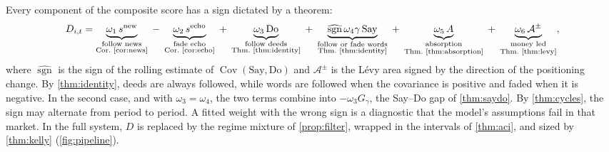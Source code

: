 \documentclass[11pt,a4paper]{article}
\theoremstyle{plain}
\theoremstyle{definition}
\theoremstyle{remark}
\DeclareMathOperator{\sgn}{sgn}
\DeclareMathOperator{\Cov}{Cov}
\begin{document}
Every component of the composite score has a sign dictated by a theorem:
\[
  D_{i,t}=
  \underbrace{\omega_1\,s^{\text{new}}}_{\substack{\text{follow news}\\ \text{Cor.~\ref{cor:news}}}}
  \;-\;\underbrace{\omega_2\,s^{\text{echo}}}_{\substack{\text{fade echo}\\ \text{Cor.~\ref{cor:echo}}}}
  \;+\;\underbrace{\omega_3\,\text{Do}}_{\substack{\text{follow deeds}\\ \text{Thm.~\ref{thm:identity}}}}
  \;+\;\underbrace{\widehat{\sgn}\,\omega_4\gamma\,\text{Say}}_{\substack{\text{follow or fade words}\\ \text{Thm.~\ref{thm:identity}}}}
  \;+\;\underbrace{\omega_5\,A}_{\substack{\text{absorption}\\ \text{Thm.~\ref{thm:absorption}}}}
  \;+\;\underbrace{\omega_6\,\mathcal{A}^{\pm}}_{\substack{\text{money led}\\ \text{Thm.~\ref{thm:levy}}}},
\]
where $\widehat{\sgn}$ is the sign of the rolling estimate of $\Cov(\text{Say},\text{Do})$ and $\mathcal{A}^{\pm}$ is the L\'evy area signed by the direction of the positioning change. By \cref{thm:identity}, deeds are always followed, while words are followed when the covariance is positive and faded when it is negative. In the second case, and with $\omega_3=\omega_4$, the two terms combine into $-\omega_3G_\gamma$, the Say--Do gap of \cref{thm:saydo}. By \cref{thm:cycles}, the sign may alternate from period to period. A fitted weight with the wrong sign is a diagnostic that the model's assumptions fail in that market. In the full system, $D$ is replaced by the regime mixture of \cref{prop:filter}, wrapped in the intervals of \cref{thm:aci}, and sized by \cref{thm:kelly} (\cref{fig:pipeline}).
\end{document}
